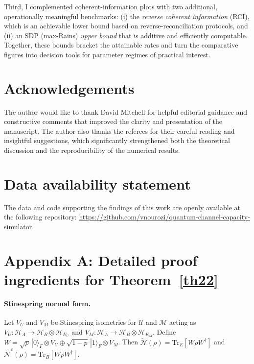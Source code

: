 \documentclass[11pt]{article}
\theoremstyle{plain}
\theoremstyle{definition}
\numberwithin{equation}{section}
\begin{document}
Third, I complemented coherent-information plots with two additional, operationally meaningful benchmarks: (i) the \emph{reverse coherent information} (RCI), which is an achievable lower bound based on reverse-reconciliation protocols, and (ii) an SDP (max-Rains) \emph{upper bound} that is additive and efficiently computable. Together, these bounds bracket the attainable rates and turn the comparative figures into decision tools for parameter regimes of practical interest. 

\section*{Acknowledgements}
The author would like to thank David Mitchell for helpful editorial guidance and constructive comments that improved the clarity and presentation of the manuscript. The author also thanks the referees for their careful reading and insightful suggestions, which significantly strengthened both the theoretical discussion and the reproducibility of the numerical results.

\section*{Data availability statement}
The data and code supporting the findings of this work are openly available at the following repository:
\href{https://github.com/vnourozi/quantum-channel-capacity-simulator}{https://github.com/vnourozi/quantum-channel-capacity-simulator}.









\appendix
\section*{Appendix A: Detailed proof ingredients for Theorem~\ref{th22}}

\paragraph{Stinespring normal form.}
Let $V_U$ and $V_M$ be Stinespring isometries for $\mathcal U$ and $\mathcal M$ acting as
$V_U:\mathcal H_A\to\mathcal H_B\otimes\mathcal H_{E_U}$ and
$V_M:\mathcal H_A\to\mathcal H_B\otimes\mathcal H_{E_M}$.
Define $W=\sqrt{p}\,|0\rangle_F\otimes V_U \oplus \sqrt{1-p}\,|1\rangle_F\otimes V_M$.
Then $\widetilde{\mathcal N}(\rho)=\mathrm{Tr}_E[W\rho W^\dagger]$ and
$\widetilde{\mathcal N}^c(\rho)=\mathrm{Tr}_B[W\rho W^\dagger]$.
\end{document}
